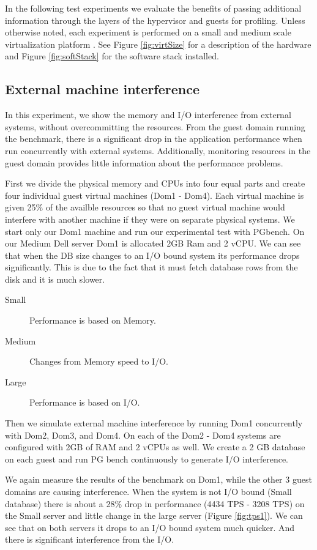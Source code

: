 In the following test experiments we evaluate the benefits of passing additional information through the layers of the hypervisor and guests for profiling.  Unless otherwise noted, each experiment is performed on a small and medium scale virtualization platform . See Figure \ref{fig:virtSize} for a description of the hardware and Figure \ref{fig:softStack} for the software stack installed.

\subsection{External machine interference}
In this experiment, we show the memory and I/O interference from external systems, without overcommitting the resources.  From the guest domain running the benchmark, there is a significant drop in the application performance when run concurrently with external systems.  Additionally, monitoring resources in the guest domain provides little information about the performance problems. 

First we divide the physical memory and CPUs into four equal parts and create four individual guest virtual machines (Dom1 - Dom4).  Each virtual machine is given 25\% of the availble resources so that no guest virtual machine would interfere with another machine if they were on separate physical systems.  We start only our Dom1 machine and run our experimental test with PGbench.  On our Medium Dell server Dom1 is allocated 2GB Ram and 2 vCPU.  We can see that when the DB size changes to an I/O bound system its performance drops significantly.  This is due to the fact that it must fetch database rows from the disk and it is much slower.  

\begin{description}
  \item[Small] Performance is based on Memory.
  \item[Medium] Changes from Memory speed to I/O.
  \item[Large] Performance is based on I/O.
\end{description}

Then we simulate external machine interference by running Dom1 concurrently with Dom2, Dom3, and Dom4. On each of the Dom2 - Dom4 systems are configured with 2GB of RAM and 2 vCPUs as well.  We create a 2 GB database on each guest and run PG bench continuously to generate I/O interference.

 We again measure the results of the benchmark on Dom1, while the other 3 guest domains are causing interference.  When the system is not I/O bound (Small database) there is about a 28\% drop in performance (4434 TPS - 3208 TPS) on the Small server and little change in the large server (Figure \ref{fig:tps1}).  We can see that on both servers it drops to an I/O bound system much quicker.  And there is significant interference from the I/O.

